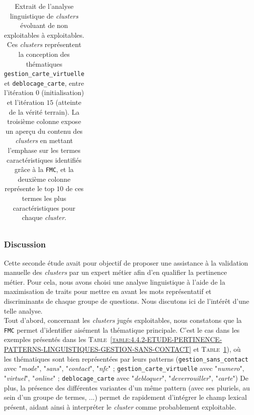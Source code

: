 \begin{table}[!htb]
\begin{center}
\begin{tabular}{|c|l|l|}
				\end{tabular}
				\end{center}
				\caption{
					Extrait de l'analyse linguistique de \textit{clusters} évoluant de non exploitables à exploitables.
					Ces \textit{clusters} représentent la conception des thématiques \texttt{gestion\_carte\_virtuelle} et \texttt{deblocage\_carte}, entre l'itération $0$ (initialisation) et l'itération $15$ (atteinte de la vérité terrain).
					La troisième colonne expose un aperçu du contenu des \textit{clusters} en mettant l'emphase sur les termes caractéristiques identifiés grâce à la \texttt{FMC}, et la deuxième colonne représente le top $10$ de ces termes les plus caractéristiques pour chaque \textit{cluster}.
				}
				\label{table:4.4.2-ETUDE-PERTINENCE-PATTERNS-LINGUISTIQUES-DEBLOCAGE-CARTE-GESTION-CARTE-VIRTUELLE}
			\end{table}

		\subsubsection{Discussion}
		
			Cette seconde étude avait pour objectif de proposer une assistance à la validation manuelle des \textit{clusters} par un expert métier afin d'en qualifier la pertinence métier.
			Pour cela, nous avons choisi une analyse linguistique à l'aide de la maximisation de traits pour mettre en avant les mots représentatif et discriminants de chaque groupe de questions.
			Nous discutons ici de l'intérêt d'une telle analyse.
			\\
			
			Tout d'abord, concernant les \textit{clusters} jugés exploitables, nous constatons que la \texttt{FMC} permet d'identifier aisément la thématique principale.
			C'est le cas dans les exemples présentés dans les \textsc{Table~\ref{table:4.4.2-ETUDE-PERTINENCE-PATTERNS-LINGUISTIQUES-GESTION-SANS-CONTACT}} et \textsc{Table~\ref{table:4.4.2-ETUDE-PERTINENCE-PATTERNS-LINGUISTIQUES-DEBLOCAGE-CARTE-GESTION-CARTE-VIRTUELLE}}), où les thématiques sont bien représentées par leurs patterns (\texttt{gestion\_sans\_contact} avec "\textit{mode}", "\textit{sans}", "\textit{contact}", "\textit{nfc}" ; \texttt{gestion\_carte\_virtuelle} avec "\textit{numero}", "\textit{virtuel}", "\textit{online}" ; \texttt{deblocage\_carte} avec "\textit{debloquer}", "\textit{deverrouiller}", "\textit{carte}")
			De plus, la présence des différentes variantes d'un même pattern (avec ses pluriels, au sein d'un groupe de termes, ...) permet de rapidement d'intégrer le champ lexical présent, aidant ainsi à interpréter le \textit{cluster} comme probablement exploitable.
			
